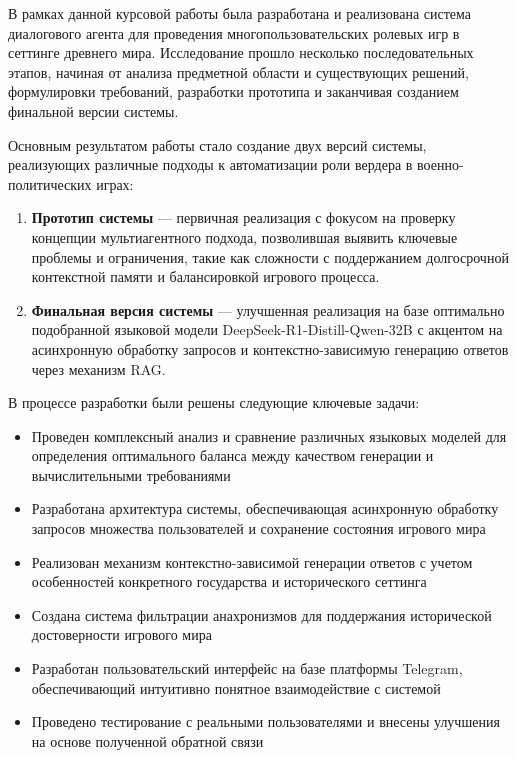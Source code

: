 В рамках данной курсовой работы была разработана и реализована система диалогового агента для проведения многопользовательских ролевых игр в сеттинге древнего мира. Исследование прошло несколько последовательных этапов, начиная от анализа предметной области и существующих решений, формулировки требований, разработки прототипа и заканчивая созданием финальной версии системы.

Основным результатом работы стало создание двух версий системы, реализующих различные подходы к автоматизации роли вердера в военно-политических играх:

\begin{enumerate}
\item \textbf{Прототип системы} — первичная реализация с фокусом на проверку концепции мультиагентного подхода, позволившая выявить ключевые проблемы и ограничения, такие как сложности с поддержанием долгосрочной контекстной памяти и балансировкой игрового процесса.

\item \textbf{Финальная версия системы} — улучшенная реализация на базе оптимально подобранной языковой модели DeepSeek-R1-Distill-Qwen-32B с акцентом на асинхронную обработку запросов и контекстно-зависимую генерацию ответов через механизм RAG.
\end{enumerate}

В процессе разработки были решены следующие ключевые задачи:

\begin{itemize}
\item Проведен комплексный анализ и сравнение различных языковых моделей для определения оптимального баланса между качеством генерации и вычислительными требованиями

\item Разработана архитектура системы, обеспечивающая асинхронную обработку запросов множества пользователей и сохранение состояния игрового мира

\item Реализован механизм контекстно-зависимой генерации ответов с учетом особенностей конкретного государства и исторического сеттинга

\item Создана система фильтрации анахронизмов для поддержания исторической достоверности игрового мира

\item Разработан пользовательский интерфейс на базе платформы Telegram, обеспечивающий интуитивно понятное взаимодействие с системой

\item Проведено тестирование с реальными пользователями и внесены улучшения на основе полученной обратной связи
\end{itemize}

